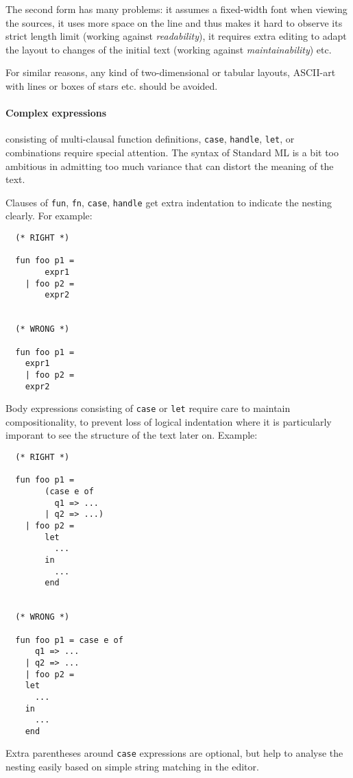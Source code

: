 \begin{isabellebody}
\begin{isamarkuptext}
  The second form has many problems: it assumes a fixed-width font
  when viewing the sources, it uses more space on the line and thus
  makes it hard to observe its strict length limit (working against
  \emph{readability}), it requires extra editing to adapt the layout
  to changes of the initial text (working against
  \emph{maintainability}) etc.

  \medskip For similar reasons, any kind of two-dimensional or tabular
  layouts, ASCII-art with lines or boxes of stars etc. should be
  avoided.

  \paragraph{Complex expressions} consisting of multi-clausal function
  definitions, \verb|case|, \verb|handle|, \verb|let|,
  or combinations require special attention.  The syntax of Standard
  ML is a bit too ambitious in admitting too much variance that can
  distort the meaning of the text.

  Clauses of \verb|fun|, \verb|fn|, \verb|case|,
  \verb|handle| get extra indentation to indicate the nesting
  clearly.  For example:

  \begin{verbatim}
  (* RIGHT *)

  fun foo p1 =
        expr1
    | foo p2 =
        expr2


  (* WRONG *)

  fun foo p1 =
    expr1
    | foo p2 =
    expr2
  \end{verbatim}

  Body expressions consisting of \verb|case| or \verb|let|
  require care to maintain compositionality, to prevent loss of
  logical indentation where it is particularly imporant to see the
  structure of the text later on.  Example:

  \begin{verbatim}
  (* RIGHT *)

  fun foo p1 =
        (case e of
          q1 => ...
        | q2 => ...)
    | foo p2 =
        let
          ...
        in
          ...
        end


  (* WRONG *)

  fun foo p1 = case e of
      q1 => ...
    | q2 => ...
    | foo p2 =
    let
      ...
    in
      ...
    end
  \end{verbatim}

  Extra parentheses around \verb|case| expressions are optional,
  but help to analyse the nesting easily based on simple string
  matching in the editor.


\end{isamarkuptext}
\end{isabellebody}

